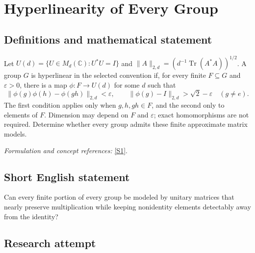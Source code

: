 \documentclass[11pt,a4paper]{article}
\newcommand{\C}{\mathbb{C}}
\newcommand{\eps}{\varepsilon}
\newcommand{\sref}[2]{\hyperlink{source:#1:#2}{[S#2]}}
\newif\ifshowcatalogue
\newcommand{\cataloguescope}[1]{\ifshowcatalogue
 \paragraph{Exact scope in the supplied catalogue.}
 \begin{quote}\small #1\end{quote}\fi}
\numberwithin{equation}{section}
\begin{document}
\setcounter{section}{153}
\clearpage
\section{\texorpdfstring{Hyperlinearity of Every Group}{Hyperlinearity of Every Group}}\label{154}
\subsection{Definitions and mathematical statement}
Let $U(d)=\{U\in M_d(\C):U^*U=I\}$ and
$\|A\|_{2,d}=(d^{-1}\operatorname{Tr}(A^*A))^{1/2}$. A group $G$ is hyperlinear in the selected convention if, for every finite $F\subseteq G$ and $\eps>0$, there is a map $\phi:F\to U(d)$ for some $d$ such that
\[
 \|\phi(g)\phi(h)-\phi(gh)\|_{2,d}<\eps,
 \qquad \|\phi(g)-I\|_{2,d}>\sqrt2-\eps\quad(g\ne e).
\]
The first condition applies only when $g,h,gh\in F$, and the second only to elements of $F$. Dimension may depend on $F$ and $\eps$; exact homomorphisms are not required. Determine whether every group admits these finite approximate matrix models.
\par\smallskip\textit{Formulation and concept references:} \sref{154}{1}.
\cataloguescope{Determine whether every group G is hyperlinear. Precisely, for each finite F contained in G and each epsilon>0, must there be d>=1 and phi:F->U(d) such that ||phi(g)phi(h)-phi(gh)||\_(2,d)<epsilon whenever g,h,gh belong to F, and ||phi(g)-I||\_(2,d)>sqrt(2)-epsilon for every nonidentity g in F? Here ||X||\_(2,d)=(Tr(X*X)/d)\textasciicircum{}(1/2) is the normalized Hilbert-Schmidt norm. A negative resolution is a group failing this condition.}
\subsection{Short English statement}
Can every finite portion of every group be modeled by unitary matrices that nearly preserve multiplication while keeping nonidentity elements detectably away from the identity?
\subsection{Research attempt}
\end{document}
